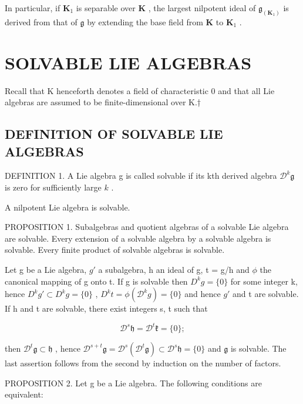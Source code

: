 In particular, if \(\mathbf{K}_1\) is separable over \(\mathbf{K}\) , the largest nilpotent ideal of \(\mathfrak{g}_{(\mathbf{K}_1)}\) is derived from that of \(\mathfrak{g}\) by extending the base field from \(\mathbf{K}\) to \(\mathbf{K}_1\) .

\section{SOLVABLE LIE ALGEBRAS}

Recall that K henceforth denotes a field of characteristic 0 and that all Lie algebras are assumed to be finite-dimensional over K.†

\subsection{DEFINITION OF SOLVABLE LIE ALGEBRAS}

DEFINITION 1. A Lie algebra g is called solvable if its kth derived algebra \(\mathcal{D}^{k}\mathfrak{g}\) is zero for sufficiently large \(k\) .

A nilpotent Lie algebra is solvable.

PROPOSITION 1. Subalgebras and quotient algebras of a solvable Lie algebra are solvable. Every extension of a solvable algebra by a solvable algebra is solvable. Every finite product of solvable algebras is solvable.

Let g be a Lie algebra, \(g'\) a subalgebra, h an ideal of g, t = g/h and \(\phi\) the canonical mapping of g onto t. If g is solvable then \(D^{k}g = \{0\}\) for some integer k, hence \(D^{k}g' \subset D^{k}g = \{0\}\) , \(D^{k}t = \phi(\mathcal{D}^{k}g) = \{0\}\) and hence \(g'\) and t are solvable. If h and t are solvable, there exist integers s, t such that

\[
\mathcal {D} ^ {s} \mathfrak {h} = \mathcal {D} ^ {t} \mathfrak {k} = \{0 \};
\]

then \(\mathcal{D}^t\mathfrak{g}\subset \mathfrak{h}\) , hence \(\mathcal{D}^{s + t}\mathfrak{g} = \mathcal{D}^{s}(\mathcal{D}^{t}\mathfrak{g})\subset \mathcal{D}^{s}\mathfrak{h} = \{0\}\) and \(\mathfrak{g}\) is solvable. The last assertion follows from the second by induction on the number of factors.

PROPOSITION 2. Let g be a Lie algebra. The following conditions are equivalent:

